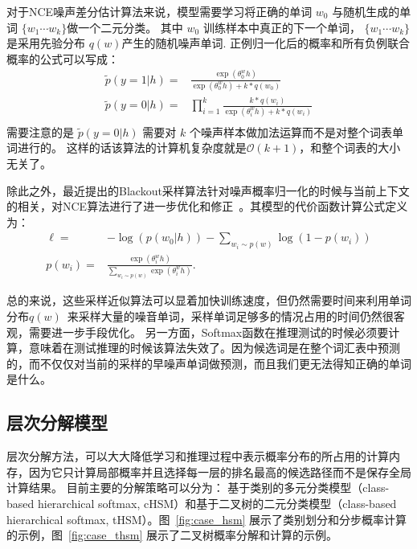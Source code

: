 对于NCE噪声差分估计算法来说，模型需要学习将正确的单词 $w_0$ 与随机生成的单词 $\{w_1\cdots w_k\}$做一个二元分类。 其中 $w_0$ 训练样本中真正的下一个单词， $\{w_1\cdots w_k\}$ 是采用先验分布  $q(w)$产生的随机噪声单词. 正例归一化后的概率和所有负例联合概率的公式可以写成：
\begin{equation}\label{equ:nce}
\begin{split}
  \tilde{p}(y=1|h)=&\frac{\exp( \theta^w_0 h)}{ \exp( \theta^w_0 h)+k *q(w_0)}\\
  \tilde{p}(y=0|h)=&\prod_{i=1}^{k}\frac{k *q(w_i)}{\exp( \theta^w_i h)+k *q(w_i)}\\
\end{split}
\end{equation}
需要注意的是 $\tilde{p}(y=0|h)$ 需要对 $k$ 个噪声样本做加法运算而不是对整个词表单词进行的。 这样的话该算法的计算机复杂度就是$\mathcal{O}(k+1)$，和整个词表的大小无关了。

除此之外，最近提出的Blackout采样算法针对噪声概率归一化的时候与当前上下文的相关，对NCE算法进行了进一步优化和修正~。其模型的代价函数计算公式定义为：
\begin{equation}
\begin{split}
  \ell=&-\log(p(w_0|h)) - \sum_{w_i \sim p(w)} \log(1 - p(w_i))\\
p(w_i) =& \frac{\exp(\theta^w_i h)}{\sum_{w_i \sim p(w)} \exp(\theta^w_i h)}.
\end{split}
\end{equation}

总的来说，这些采样近似算法可以显着加快训练速度，但仍然需要时间来利用单词分布$q(w)$~来采样大量的噪音单词，采样单词足够多的情况占用的时间仍然很客观，需要进一步手段优化。 另一方面，Softmax函数在推理测试的时候必须要计算，意味着在测试推理的时候该算法失效了。因为候选词是在整个词汇表中预测的，而不仅仅对当前的采样的早噪声单词做预测，而且我们更无法得知正确的单词是什么。

\subsection{层次分解模型}
层次分解方法，可以大大降低学习和推理过程中表示概率分布的所占用的计算内存，因为它只计算局部概率并且选择每一层的排名最高的候选路径而不是保存全局计算结果。
目前主要的分解策略可以分为： 基于类别的多元分类模型（class-based hierarchical softmax, cHSM）和基于二叉树的二元分类模型（class-based hierarchical softmax, tHSM）。图~\ref{fig:case_hsm} 展示了类别划分和分步概率计算的示例，图~\ref{fig:case_thsm} 展示了二叉树概率分解和计算的示例。

